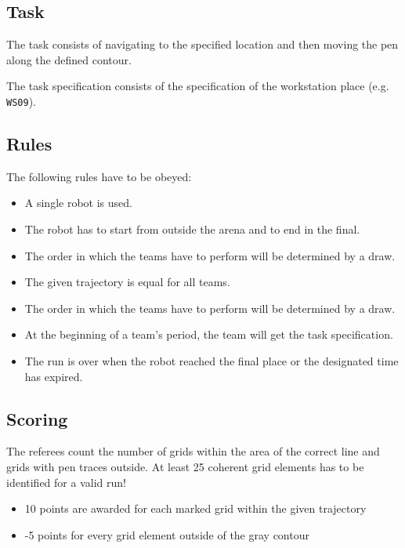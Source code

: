 \subsection{Task}
The task consists of navigating to the specified location and then
moving the pen along the defined contour. 
\par
The task specification consists of the specification of the workstation place (e.g. \texttt{WS09}).

\subsection{Rules}
The following rules have to be obeyed:

\begin{itemize}
\item A single robot is used. 
\item The robot has to start from outside the arena and to end in the final.
\item The order in which the teams have to perform will be determined by a draw.
\item The given trajectory is equal for all teams.
\item The order in which the teams have to perform will be determined by a draw.
\item At the beginning of a team's period, the team will get the task specification.
\item The run is over when the robot reached the final place or the designated time has expired.
\end{itemize}

\subsection{Scoring}
The referees count the number of grids within the area of the correct line and
grids with pen traces outside. At least 25 coherent grid elements has to be
identified for a valid run!

\begin{itemize}
\item 10 points are awarded for each marked grid within the given trajectory
\item -5 points for every grid element outside of the gray contour
\end{itemize}

